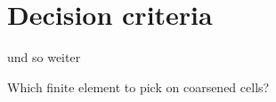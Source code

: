 \section{Decision criteria}
\label{sec:decision}

\cite{melenk2001} \cite{ainsworth1998} und so weiter

Which finite element to pick on coarsened cells?